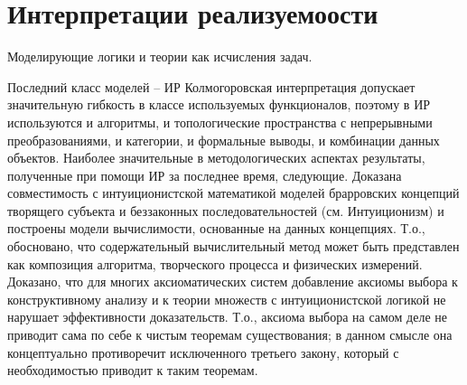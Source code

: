 \documentclass[12pt, a4paper]{article}
\begin{document}
\section{Интерпретации реализуемоости}

Моделирующие логики и теории как исчисления задач.

Последний класс моделей – ИР Колмогоровская интерпретация допускает значительную гибкость в
классе используемых функционалов, поэтому в ИР используются и алгоритмы, и топологические
пространства с непрерывными преобразованиями, и категории, и формальные выводы, и комбинации
данных объектов.
Наиболее значительные в методологических аспектах результаты, полученные при помощи ИР за
последнее время, следующие. Доказана совместимость с интуиционистской математикой моделей
брарровских концепций творящего субъекта и беззаконных последовательностей (см. Интуиционизм)
и построены модели вычислимости, основанные на данных концепциях. Т.о., обосновано, что
содержательный вычислительный метод может быть представлен как композиция алгоритма,
творческого процесса и физических измерений. Доказано, что для многих аксиоматических систем
добавление аксиомы выбора к конструктивному анализу и к теории множеств с интуиционистской
логикой не нарушает эффективности доказательств. Т.о., аксиома выбора на самом деле не приводит
сама по себе к чистым теоремам существования; в данном смысле она концептуально противоречит
исключенного третьего закону, который с необходимостью приводит к таким теоремам.
\end{document}

